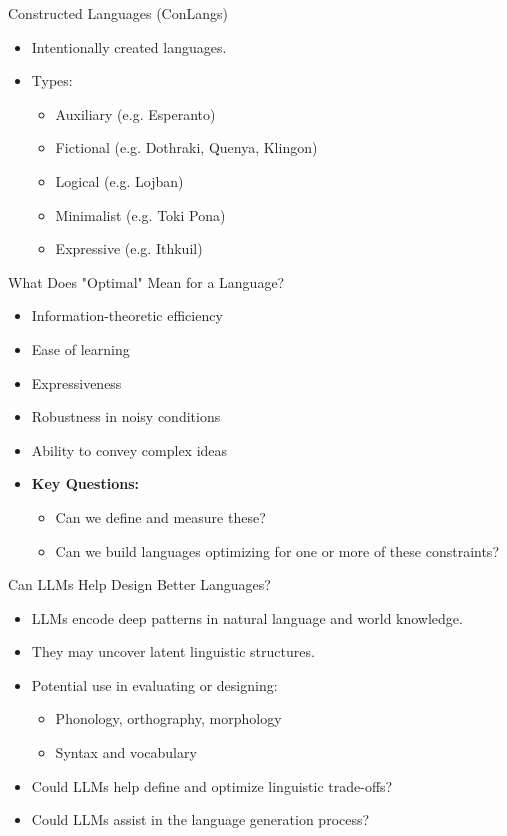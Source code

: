 \documentclass{beamer}
\begin{document}
\begin{frame}{Constructed Languages (ConLangs)}
	\begin{itemize}
		\item Intentionally created languages.
		\item Types:
		\begin{itemize}
			\item Auxiliary (e.g. Esperanto)
			\item Fictional (e.g. Dothraki, Quenya, Klingon)
			\item Logical (e.g. Lojban)
			\item Minimalist (e.g. Toki Pona)
			\item Expressive (e.g. Ithkuil)
		\end{itemize}
	\end{itemize}
\end{frame}

\begin{frame}{What Does "Optimal" Mean for a Language?}
	\begin{itemize}
		\item Information-theoretic efficiency
		\item Ease of learning
		\item Expressiveness
		\item Robustness in noisy conditions
		\item Ability to convey complex ideas
		\item \textbf{Key Questions:}
		\begin{itemize}
			\item Can we define and measure these?
			\item Can we build languages optimizing for one or more of these constraints?
		\end{itemize}
	\end{itemize}
\end{frame}

\begin{frame}{Can LLMs Help Design Better Languages?}
	\begin{itemize}
		\item LLMs encode deep patterns in natural language and world knowledge.
		\item They may uncover latent linguistic structures.
		\item Potential use in evaluating or designing:
		\begin{itemize}
			\item Phonology, orthography, morphology
			\item Syntax and vocabulary
		\end{itemize}
		\item Could LLMs help define and optimize linguistic trade-offs?
		\item Could LLMs assist in the language generation process?
	\end{itemize}
\end{frame}
\end{document}
